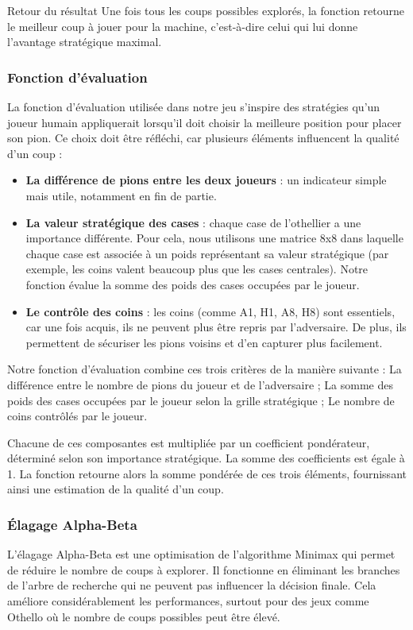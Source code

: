 \documentclass[a4paper,12pt]{article}
\begin{document}
\begin{itemize}
Retour du résultat
Une fois tous les coups possibles explorés, la fonction retourne le meilleur coup à jouer pour la machine, c’est-à-dire celui qui lui donne l’avantage stratégique maximal.

\subsubsection{Fonction d'évaluation}
La fonction d’évaluation utilisée dans notre jeu s’inspire des stratégies qu’un joueur humain appliquerait lorsqu’il doit choisir la meilleure position pour placer son pion. Ce choix doit être réfléchi, car plusieurs éléments influencent la qualité d’un coup :
\begin{itemize}

 \item \textbf{La différence de pions  entre les deux joueurs } : un indicateur simple mais utile, notamment en fin de partie.
 \item \textbf{La valeur stratégique des cases} : chaque case de l’othellier a une importance différente. Pour cela, nous utilisons une matrice 8x8 dans laquelle chaque case est associée à un poids représentant sa valeur stratégique (par exemple, les coins valent beaucoup plus que les cases centrales). Notre fonction évalue la somme des poids des cases occupées par le joueur.
\item \textbf{Le contrôle des coins} : les coins (comme A1, H1, A8, H8) sont essentiels, car une fois acquis, ils ne peuvent plus être repris par l’adversaire. De plus, ils permettent de sécuriser les pions voisins et d’en capturer plus facilement.
\end{itemize}
Notre fonction d’évaluation combine ces trois critères de la manière suivante :
La différence entre le nombre de pions du joueur et de l’adversaire ;
La somme des poids des cases occupées par le joueur selon la grille stratégique ;
Le nombre de coins contrôlés par le joueur.

Chacune de ces composantes est multipliée par un coefficient pondérateur, déterminé selon son importance stratégique. La somme des coefficients est égale à 1. La fonction retourne alors la somme pondérée de ces trois éléments, fournissant ainsi une estimation de la qualité d’un coup.

\end{itemize}



\subsubsection{Élagage Alpha-Beta}
L'élagage Alpha-Beta est une optimisation de l'algorithme Minimax qui permet de réduire le nombre de coups à explorer. Il fonctionne en éliminant les branches de l'arbre de recherche qui ne peuvent pas influencer la décision finale. Cela améliore considérablement les performances, surtout pour des jeux comme Othello où le nombre de coups possibles peut être élevé.
\end{document}
